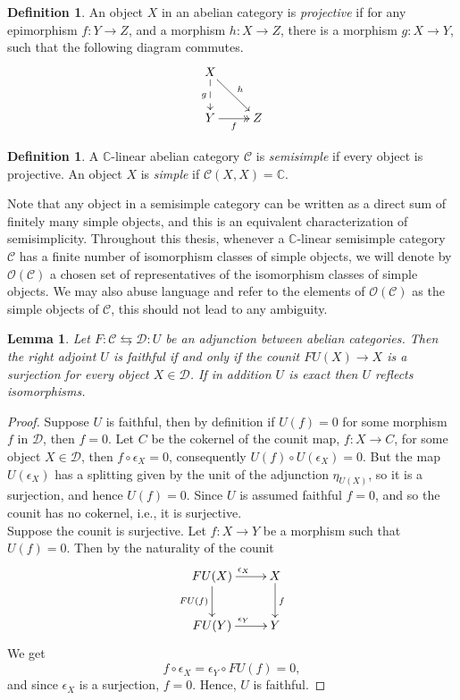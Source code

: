 \documentclass[a4paper, 10pt]{book}
\newtheorem{Lem}[theorem]{Lemma}
\theoremstyle{definition}
\newtheorem{Def}[theorem]{Definition}
\numberwithin{equation}{chapter}
\newcommand\kk{\mathbb C}
\newcommand\C{\mathcal C}
\newcommand\OO{\mathcal O}
\newcommand\D{\mathcal D}
\newcommand{\ra}\rightarrow
\begin{document}
\begin{Def}
An object $X$ in an abelian category is \textit{projective} if for any epimorphism $f:Y\ra Z$, and a morphism $h: X\ra Z$, there is a morphism $g: X\ra Y$, such that the following diagram commutes.
\[
\xymatrix{
	X \ar[rd]^h\ar@{-->}[d]_g\\
	Y \ar@{>>}[r]_f& Z
}
\] 
\end{Def}
\begin{Def}
A $\kk$-linear abelian category $\C$ is \textit{semisimple} if every object is projective. An object $X$ is \textit{simple} if $\C(X, X) = \kk$.
\end{Def}

Note that any object in a semisimple category can be written as a direct sum of finitely many simple objects, and this is an equivalent characterization of semisimplicity. Throughout this thesis, whenever a $\kk$-linear semisimple category $\C$ has a finite number of isomorphism classes of simple objects, we will denote by $\OO(\C)$ a chosen set of representatives of the isomorphism classes of simple objects. We may also abuse language and refer to the elements of $\OO(\C)$ as the simple objects of $\C$, this should not lead to any ambiguity.

\iffalse
\begin{Lem}
Let $F:\C \leftrightarrows \D: U$ be an adjunction between abelian categories. Then the right adjoint $U$ is faithful if and only if the counit $FU(X)\rightarrow X$ is a surjection for every object $X \in \D$. If in addition $U$ is exact then $U$ reflects isomorphisms.
\end{Lem}
\begin{proof}
Suppose $U$ is faithful, then by definition if $U(f) = 0$ for some morphism $f$ in $\D$, then $f=0$. Let $C$ be the cokernel of the counit map, $f: X \rightarrow C$, for some object $X\in \D$, then $f\circ \epsilon_X = 0$, consequently $U(f)\circ U(\epsilon_X) = 0$.  But the map $U(\epsilon_X)$ has a splitting given by the unit of the adjunction $\eta_{U(X)}$, so it is a surjection, and hence $U(f)=0$. Since $U$ is assumed faithful $f=0$, and so the counit has no cokernel, i.e., it is surjective. \\
Suppose the counit is surjective. Let $f:X\rightarrow Y$ be a morphism such that $U(f)=0$. Then by the naturality of the counit \begin{equation*}
	\xymatrix{
	FU(X) \ar[d]_{FU(f)} \ar[r]^{\epsilon_X} & X \ar[d]^{f} \\
	FU(Y) \ar[r]^{\epsilon_Y} & Y
	}
\end{equation*}                                                                                                             We get \begin{equation*}
	f\circ \epsilon_X = \epsilon_Y \circ FU(f) = 0,
\end{equation*}                                
and since $\epsilon_X$ is a surjection, $f=0$. Hence, $U$ is faithful.        
\end{proof}
\end{document}
